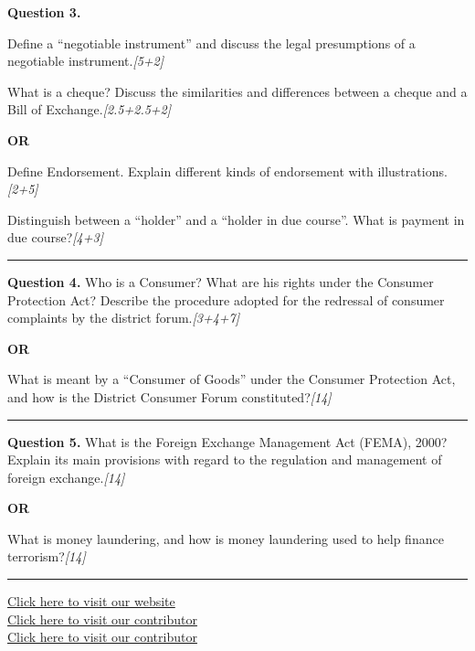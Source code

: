 \documentclass[11pt,a4paper]{article}
\newcommand{\pts}[1]{\hfill   \textit{[#1]}}
\begin{document}
\noindent   \textbf{Question 3.}

\begin{parts}
  \item Define a ``negotiable instrument'' and discuss the legal presumptions of a negotiable instrument.\pts{5+2}
  \item What is a cheque? Discuss the similarities and differences between a cheque and a Bill of Exchange.\pts{2.5+2.5+2}
\end{parts}

\centerline{   \textbf{OR}}


\begin{parts}
  \item Define Endorsement. Explain different kinds of endorsement with illustrations.\pts{2+5}
  \item Distinguish between a ``holder'' and a ``holder in due course''. What is payment in due course?\pts{4+3}
\end{parts}

\medskip\rule{\linewidth}{0.2pt}




\noindent   \textbf{Question 4.}
Who is a Consumer? What are his rights under the Consumer Protection Act? Describe the procedure adopted for the redressal of consumer complaints by the district forum.\pts{3+4+7}

\centerline{   \textbf{OR}}

What is meant by a ``Consumer of Goods'' under the Consumer Protection Act, and how is the District Consumer Forum constituted?\pts{14}

\medskip\rule{\linewidth}{0.2pt}




\noindent   \textbf{Question 5.}
What is the Foreign Exchange Management Act (FEMA), 2000? Explain its main provisions with regard to the regulation and management of foreign exchange.\pts{14}

\centerline{   \textbf{OR}}

What is money laundering, and how is money laundering used to help finance terrorism?\pts{14}

\vfill
\rule{\linewidth}{0.4pt}

\begin{center}\small
\href{https://bhu-exam.vercel.app/}{Click here to visit our website}\\[4pt]
\href{https://me-aryan.vercel.app/}{Click here to visit our contributor}\\[4pt]
\href{https://quashan-me.vercel.app/}{Click here to visit our contributor}
\end{center}
\end{document}
